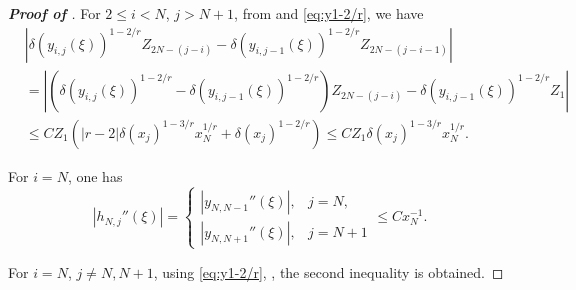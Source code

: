 \documentclass{amsart}
\theoremstyle{definition}
\theoremstyle{remark}
\numberwithin{equation}{section}
\begin{document}
\begin{proof} [\bf Proof of ]
  For $2\le i<N$, \(j > N+1\), from  and \eqref{eq:y1-2/r}, we have
  \begin{equation*}
    \begin{aligned}
      & \left|  \delta(y_{i,j}(\xi))^{1-2/r} Z_{2N-(j-i)} - \delta(y_{i,j-1}(\xi))^{1-2/r} Z_{2N-(j-i-1)}  \right| \\
      & = \left|  \left( \delta(y_{i,j}(\xi))^{1-2/r} - \delta(y_{i,j-1}(\xi))^{1-2/r} \right) Z_{2N-(j-i)} - \delta(y_{i, j-1}(\xi))^{1-2/r} Z_1  \right|   \\
      &\le C Z_1 \left( |r-2| \delta(x_j)^{1-3/r} x_N^{1/r} + \delta(x_j)^{1-2/r}  \right) \le C Z_1 \delta(x_j)^{1-3/r} x_N^{1/r}.
    \end{aligned}
  \end{equation*}
  
  For \(i=N\), one has
  \begin{equation*}
    |h_{N,j}''(\xi)| = 
    \begin{cases}
        |y_{N,N-1}''(\xi)|, & j=N, \\ |y_{N, N+1}''(\xi)|, & j=N+1
    \end{cases}
    \le C x_N^{-1}.
  \end{equation*}

  For \(i=N\), $j\neq N, N+1$, using \eqref{eq:y1-2/r}, , the second inequality is obtained.
\end{proof}
\end{document}
